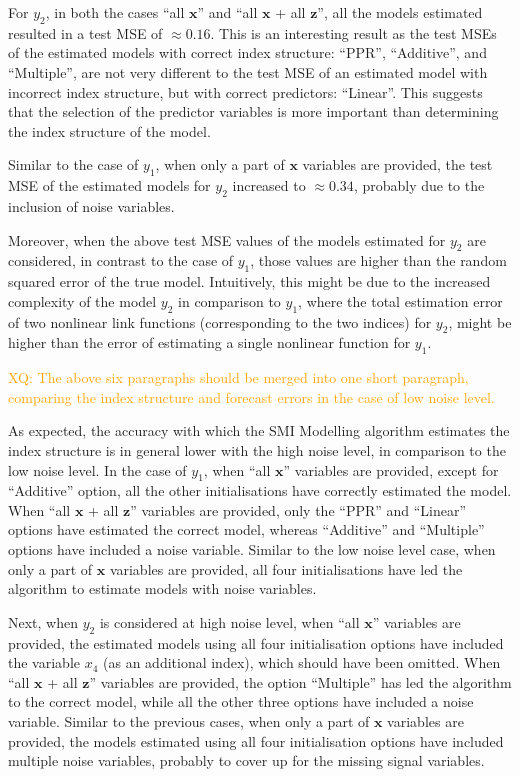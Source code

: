\documentclass[11pt,a4paper,]{article}
\begin{document}
For \(y_{2}\), in both the cases ``all \(\bm{x}\)'' and ``all \(\bm{x}\)
+ all \(\bm{z}\)'', all the models estimated resulted in a test MSE of
\(\approx 0.16\). This is an interesting result as the test MSEs of the
estimated models with correct index structure: ``PPR'', ``Additive'',
and ``Multiple'', are not very different to the test MSE of an estimated
model with incorrect index structure, but with correct predictors:
``Linear''. This suggests that the selection of the predictor variables
is more important than determining the index structure of the model.

Similar to the case of \(y_{1}\), when only a part of \(\bm{x}\)
variables are provided, the test MSE of the estimated models for
\(y_{2}\) increased to \(\approx 0.34\), probably due to the inclusion
of noise variables.

Moreover, when the above test MSE values of the models estimated for
\(y_{2}\) are considered, in contrast to the case of \(y_{1}\), those
values are higher than the random squared error of the true model.
Intuitively, this might be due to the increased complexity of the model
\(y_{2}\) in comparison to \(y_{1}\), where the total estimation error
of two nonlinear link functions (corresponding to the two indices) for
\(y_{2}\), might be higher than the error of estimating a single
nonlinear function for \(y_{1}\).

\textcolor{orange}{XQ: The above six paragraphs should be merged into one short paragraph, comparing the index structure and forecast errors in the case of low noise level.}

As expected, the accuracy with which the SMI Modelling algorithm
estimates the index structure is in general lower with the high noise
level, in comparison to the low noise level. In the case of \(y_{1}\),
when ``all \(\bm{x}\)'' variables are provided, except for ``Additive''
option, all the other initialisations have correctly estimated the
model. When ``all \(\bm{x}\) + all \(\bm{z}\)'' variables are provided,
only the ``PPR'' and ``Linear'' options have estimated the correct
model, whereas ``Additive'' and ``Multiple'' options have included a
noise variable. Similar to the low noise level case, when only a part of
\(\bm{x}\) variables are provided, all four initialisations have led the
algorithm to estimate models with noise variables.

Next, when \(y_{2}\) is considered at high noise level, when ``all
\(\bm{x}\)'' variables are provided, the estimated models using all four
initialisation options have included the variable \(x_{4}\) (as an
additional index), which should have been omitted. When ``all \(\bm{x}\)
+ all \(\bm{z}\)'' variables are provided, the option ``Multiple'' has
led the algorithm to the correct model, while all the other three
options have included a noise variable. Similar to the previous cases,
when only a part of \(\bm{x}\) variables are provided, the models
estimated using all four initialisation options have included multiple
noise variables, probably to cover up for the missing signal variables.
\end{document}
